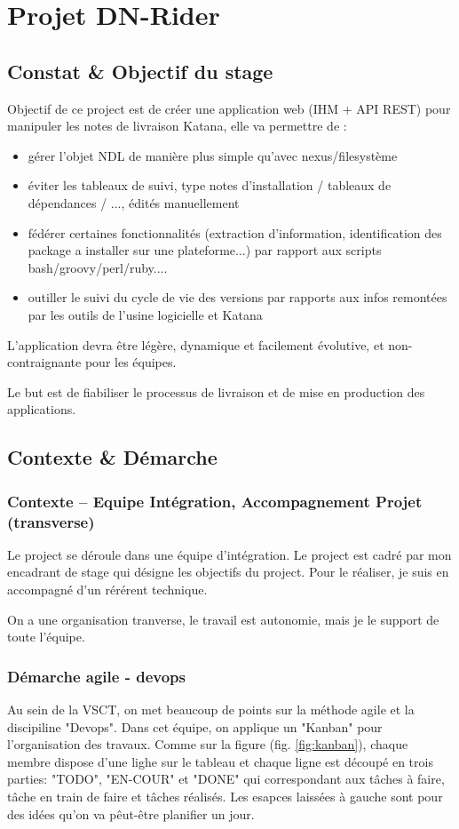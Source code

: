 \chapter{Projet DN-Rider}
\label{chap:Projet DN-Rider}

\section{Constat \& Objectif du stage}
Objectif de ce project est de créer une application web (IHM + API REST) pour manipuler les notes de livraison Katana, elle va permettre de :

\begin{itemize}
  \item gérer l'objet NDL de manière plus simple qu'avec nexus/filesystème
  \item éviter les tableaux de suivi, type notes d'installation / tableaux de dépendances / ..., édités manuellement
  \item fédérer certaines fonctionnalités (extraction d'information, identification des package a installer sur une plateforme...) par rapport aux scripts bash/groovy/perl/ruby....
  \item  outiller le suivi du cycle de vie des versions par rapports aux infos remontées par les outils de l'usine logicielle et Katana
\end{itemize}

L’application devra être légère, dynamique et facilement évolutive, et non-contraignante pour les équipes.

Le but est de fiabiliser le processus de livraison et de mise en production des applications.
\clearpage

\section{Contexte \& Démarche}
\subsection{Contexte -- Equipe Intégration, Accompagnement Projet (transverse)}
Le project se déroule dans une équipe d'intégration. Le project est cadré par mon encadrant de stage qui désigne les objectifs du project. Pour le réaliser, je suis en accompagné d'un rérérent technique.

On a une organisation tranverse, le travail est autonomie, mais je le support de toute l'équipe.

\subsection{Démarche agile - devops}
Au sein de la VSCT, on met beaucoup de points sur la méthode agile et la discipiline "Devops". Dans cet équipe, on applique un "Kanban" pour l'organisation des travaux.  Comme sur la figure (fig. \ref{fig:kanban}), chaque membre dispose d'une lighe sur le tableau et chaque ligne est découpé en trois parties: "TODO", "EN-COUR" et "DONE" qui correspondant aux tâches à faire, tâche en train de faire et tâches réalisés. Les esapces laissées à gauche sont pour des idées qu'on va pêut-être planifier un jour.

